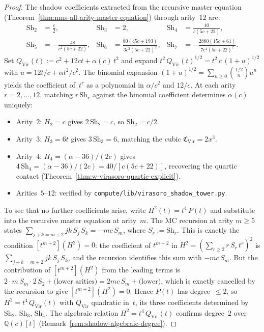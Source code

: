 \begin{proof}
The shadow coefficients extracted from the recursive master
equation (Theorem~\ref{thm:nms-all-arity-master-equation})
through arity~$12$ are:
\begin{align*}
\mathrm{Sh}_2 &= \frac{c}{2}, &
\mathrm{Sh}_3 &= 2, &
\mathrm{Sh}_4 &= \frac{10}{c(5c+22)}, \\
\mathrm{Sh}_5 &= -\frac{48}{c^2(5c+22)}, &
\mathrm{Sh}_6 &= \frac{80(45c+193)}{3c^3(5c+22)^2}, &
\mathrm{Sh}_7 &= -\frac{2880(15c+61)}{7c^4(5c+22)^2}.
\end{align*}
Set $Q_{\mathrm{Vir}}(t) := c^2 + 12ct + \alpha(c)\,t^2$ and expand
$t^2\,Q_{\mathrm{Vir}}(t)^{1/2} = t^2\,c\,(1 + u)^{1/2}$ with
$u = 12t/c + \alpha t^2/c^2$.  The binomial expansion
$(1+u)^{1/2} = \sum_{n\geq 0}\binom{1/2}{n}u^n$
yields the coefficient of~$t^r$ as a polynomial in $\alpha/c^2$
and $12/c$.  At each arity $r = 2,\ldots,12$, matching
$r\,\mathrm{Sh}_r$ against the binomial coefficient determines
$\alpha(c)$ uniquely:
\begin{itemize}[nosep]
\item Arity~$2$: $H_2 = c$ gives $2\,\mathrm{Sh}_2 = c$, so
  $\mathrm{Sh}_2 = c/2$.
\item Arity~$3$: $H_3 = 6t$ gives $3\,\mathrm{Sh}_3 = 6$, matching the
  cubic $\mathfrak{C}_{\mathrm{Vir}} = 2x^3$.
\item Arity~$4$: $H_4 = (\alpha - 36)/(2c)$ gives
  $4\,\mathrm{Sh}_4 = (\alpha - 36)/(2c) = 40/[c(5c{+}22)]$,
  recovering the quartic contact
  (Theorem~\ref{thm:w-virasoro-quartic-explicit}).
\item Arities~$5$--$12$: verified by
  \texttt{compute/lib/virasoro\_shadow\_tower.py}.
\end{itemize}
To see that no further coefficients arise, write $H^2(t) = t^4\,P(t)$
and substitute into the recursive master equation at arity~$m$.
The MC recursion at arity $m \geq 5$ states
$\sum_{j+k=m+2} jk\,S_j\,S_k = -mc\,S_m$,
where $S_r := \mathrm{Sh}_r$.  This is exactly the condition
$[t^{m+2}](H^2) = 0$: the coefficient of $t^{m+2}$ in
$H^2 = (\sum_{r \geq 2} r\,S_r\, t^r)^2$ is
$\sum_{j+k=m+2} jk\,S_j\,S_k$, and the recursion identifies this
sum with $-mc\,S_m$.  But the contribution of
$[t^{m+2}](H^2)$ from the leading terms is
$2 \cdot m\,S_m \cdot 2\,S_2 + \text{(lower arities)}
= 2mc\,S_m + \text{(lower)}$,
which is exactly cancelled by the recursion to give
$[t^{m+2}](H^2) = 0$.  Hence $P(t)$ has degree~$\leq 2$, so
$H^2 = t^4\,Q_{\mathrm{Vir}}(t)$ with $Q_{\mathrm{Vir}}$
quadratic in~$t$, its three coefficients determined by
$\mathrm{Sh}_2$, $\mathrm{Sh}_3$, $\mathrm{Sh}_4$.
The algebraic relation $H^2 = t^4\,Q_{\mathrm{Vir}}(t)$ confirms
degree~$2$ over $\mathbb{Q}(c)[t]$
(Remark~\ref{rem:shadow-algebraic-degree}).
\end{proof}

